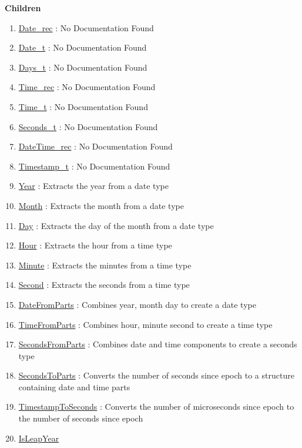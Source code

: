 \textbf{Children}
\begin{enumerate}
\item \hyperlink{ecldoc:date.date_rec}{Date\_rec}
: No Documentation Found
\item \hyperlink{ecldoc:date.date_t}{Date\_t}
: No Documentation Found
\item \hyperlink{ecldoc:date.days_t}{Days\_t}
: No Documentation Found
\item \hyperlink{ecldoc:date.time_rec}{Time\_rec}
: No Documentation Found
\item \hyperlink{ecldoc:date.time_t}{Time\_t}
: No Documentation Found
\item \hyperlink{ecldoc:date.seconds_t}{Seconds\_t}
: No Documentation Found
\item \hyperlink{ecldoc:date.datetime_rec}{DateTime\_rec}
: No Documentation Found
\item \hyperlink{ecldoc:date.timestamp_t}{Timestamp\_t}
: No Documentation Found
\item \hyperlink{ecldoc:date.year}{Year}
: Extracts the year from a date type
\item \hyperlink{ecldoc:date.month}{Month}
: Extracts the month from a date type
\item \hyperlink{ecldoc:date.day}{Day}
: Extracts the day of the month from a date type
\item \hyperlink{ecldoc:date.hour}{Hour}
: Extracts the hour from a time type
\item \hyperlink{ecldoc:date.minute}{Minute}
: Extracts the minutes from a time type
\item \hyperlink{ecldoc:date.second}{Second}
: Extracts the seconds from a time type
\item \hyperlink{ecldoc:date.datefromparts}{DateFromParts}
: Combines year, month day to create a date type
\item \hyperlink{ecldoc:date.timefromparts}{TimeFromParts}
: Combines hour, minute second to create a time type
\item \hyperlink{ecldoc:date.secondsfromparts}{SecondsFromParts}
: Combines date and time components to create a seconds type
\item \hyperlink{ecldoc:date.secondstoparts}{SecondsToParts}
: Converts the number of seconds since epoch to a structure containing date and time parts
\item \hyperlink{ecldoc:date.timestamptoseconds}{TimestampToSeconds}
: Converts the number of microseconds since epoch to the number of seconds since epoch
\item \hyperlink{ecldoc:date.isleapyear}{IsLeapYear}

\end{enumerate}
